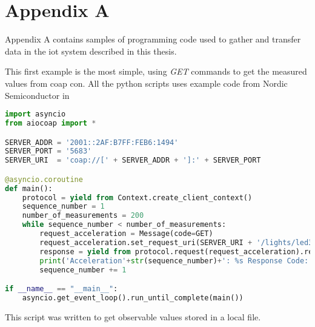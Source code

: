 \chapter{Appendix A}
\label{chp:appendix}

Appendix A contains samples of programming code used to gather and transfer data in the \gls{iot} system described in this thesis. 

This first example is the most simple, using \textit{GET} commands to get the measured values from \gls{coap} \gls{con}. All the python scripts uses example code from Nordic Semiconductor in 

\begin{lstlisting}[language=Python]
import asyncio
from aiocoap import *

SERVER_ADDR = '2001::2AF:B7FF:FEB6:1494'
SERVER_PORT = '5683'
SERVER_URI  = 'coap://[' + SERVER_ADDR + ']:' + SERVER_PORT

@asyncio.coroutine
def main():
	protocol = yield from Context.create_client_context()
	sequence_number = 1
	number_of_measurements = 200
	while sequence_number < number_of_measurements:
		request_acceleration = Message(code=GET)
		request_acceleration.set_request_uri(SERVER_URI + '/lights/led3')
		response = yield from protocol.request(request_acceleration).response
		print('Acceleration'+str(sequence_number)+': %s Response Code: %s\n'%(response.payload, response.code))		
		sequence_number += 1

if __name__ == "__main__":
	asyncio.get_event_loop().run_until_complete(main())

\end{lstlisting}

\newpage

This script was written to get observable values stored in a local file. 

